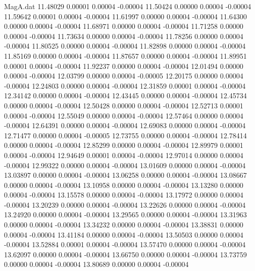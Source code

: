 \begin{filecontents}{MagA.dat}
  11.48029    0.00001    0.00004   -0.00004
  11.50424    0.00000    0.00004   -0.00004
  11.59642    0.00001    0.00004   -0.00004
  11.61997    0.00000    0.00004   -0.00004
  11.64300    0.00000    0.00004   -0.00004
  11.68971    0.00000    0.00004   -0.00004
  11.71258    0.00000    0.00004   -0.00004
  11.73634    0.00000    0.00004   -0.00004
  11.78256    0.00000    0.00004   -0.00004
  11.80525    0.00000    0.00004   -0.00004
  11.82898    0.00000    0.00004   -0.00004
  11.85169    0.00000    0.00004   -0.00004
  11.87657    0.00000    0.00004   -0.00004
  11.89951    0.00001    0.00004   -0.00004
  11.92237    0.00000    0.00004   -0.00004
  12.01494    0.00000    0.00004   -0.00004
  12.03799    0.00000    0.00004   -0.00005
  12.20175    0.00000    0.00004   -0.00004
  12.24803    0.00000    0.00004   -0.00004
  12.31859    0.00001    0.00004   -0.00004
  12.34142    0.00000    0.00004   -0.00004
  12.43445    0.00000    0.00004   -0.00004
  12.45734    0.00000    0.00004   -0.00004
  12.50428    0.00000    0.00004   -0.00004
  12.52713    0.00001    0.00004   -0.00004
  12.55049    0.00000    0.00004   -0.00004
  12.57464    0.00000    0.00004   -0.00004
  12.64391    0.00000    0.00004   -0.00004
  12.69083    0.00000    0.00004   -0.00004
  12.71477    0.00000    0.00004   -0.00005
  12.73755    0.00000    0.00004   -0.00004
  12.78414    0.00000    0.00004   -0.00004
  12.85299    0.00000    0.00004   -0.00004
  12.89979    0.00001    0.00004   -0.00004
  12.94649    0.00001    0.00004   -0.00004
  12.97014    0.00000    0.00004   -0.00004
  12.99322    0.00000    0.00004   -0.00004
  13.01609    0.00000    0.00004   -0.00004
  13.03897    0.00000    0.00004   -0.00004
  13.06258    0.00000    0.00004   -0.00004
  13.08667    0.00000    0.00004   -0.00004
  13.10958    0.00000    0.00004   -0.00004
  13.13280    0.00000    0.00004   -0.00004
  13.15578    0.00000    0.00004   -0.00004
  13.17972    0.00000    0.00004   -0.00004
  13.20239    0.00000    0.00004   -0.00004
  13.22626    0.00000    0.00004   -0.00004
  13.24920    0.00000    0.00004   -0.00004
  13.29565    0.00000    0.00004   -0.00004
  13.31963    0.00000    0.00004   -0.00004
  13.34232    0.00000    0.00004   -0.00004
  13.38831    0.00000    0.00004   -0.00004
  13.41184    0.00000    0.00004   -0.00004
  13.50503    0.00000    0.00004   -0.00004
  13.52884    0.00001    0.00004   -0.00004
  13.57470    0.00000    0.00004   -0.00004
  13.62097    0.00000    0.00004   -0.00004
  13.66750    0.00000    0.00004   -0.00004
  13.73759    0.00000    0.00004   -0.00004
  13.80689    0.00000    0.00004   -0.00004

\end{filecontents}
